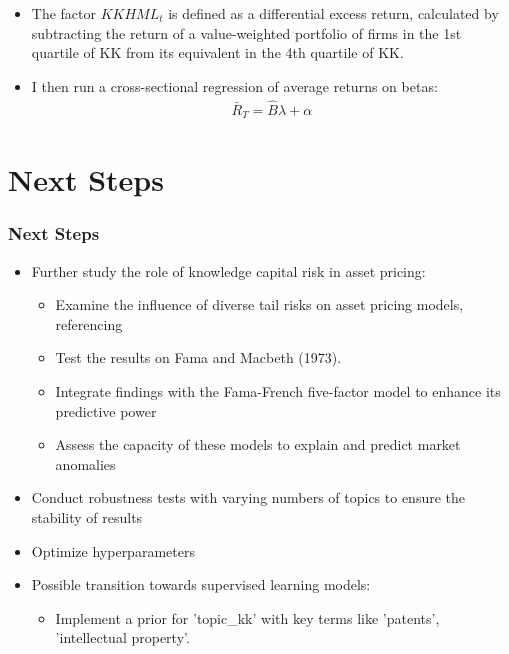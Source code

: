 \documentclass{beamer}
\begin{document}
\begin{frame}
\begin{itemize}
	\item The factor $KKHML_t$ is defined as a differential excess return, calculated by subtracting the return of a value-weighted portfolio of firms in the 1st quartile of KK from its equivalent in the 4th quartile of KK.
	\item I then run a cross-sectional regression of average returns on betas:
\begin{align}
\bar{R}_T=\widehat{B} \lambda+\alpha
\end{align}
\end{itemize}

\end{frame}



\section{Next Steps}

\begin{frame}
\frametitle{Next Steps}
\begin{itemize}
    \item Further study the role of knowledge capital risk in asset pricing:
    \begin{itemize}
        \item Examine the influence of diverse tail risks on asset pricing models, referencing \cite{Kelly2014-oo}
        \item Test the results on Fama and Macbeth (1973).
        \item Integrate findings with the Fama-French five-factor model to enhance its predictive power
        \item Assess the capacity of these models to explain and predict market anomalies
    \end{itemize}
    \item Conduct robustness tests with varying numbers of topics to ensure the stability of results 
    \item Optimize hyperparameters
    \item Possible transition towards supervised learning models:
    \begin{itemize}
        \item Implement a prior for 'topic\_kk' with key terms like 'patents', 'intellectual property'.
    \end{itemize}
\end{itemize}
\end{frame}
\end{document}
